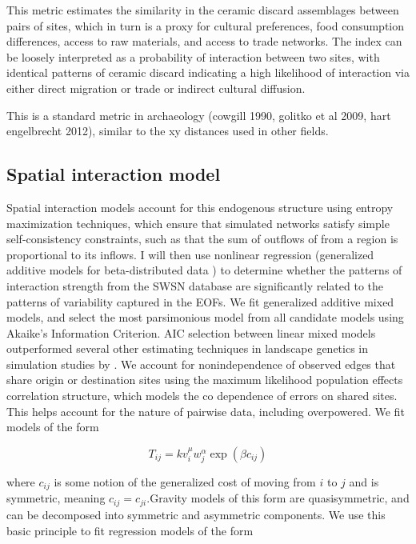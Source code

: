 \documentclass[fleqn,10pt]{wlscirep}
\begin{document}
This metric estimates the similarity in the ceramic discard assemblages between pairs of sites, which in turn is a proxy for cultural preferences, food consumption differences, access to raw materials, and access to trade networks. The index can be loosely interpreted as a probability of interaction between two sites, with identical patterns of ceramic discard indicating a high likelihood of interaction via either direct migration or trade or indirect cultural diffusion.

This is a standard metric in archaeology (cowgill 1990, golitko et al 2009, hart engelbrecht 2012), similar to the xy distances used in other fields.

\subsection*{Spatial interaction model}
Spatial interaction models account for this endogenous structure using entropy maximization techniques, which ensure that simulated networks satisfy simple self-consistency constraints, such as that the sum of outflows of from a region is proportional to its inflows.
I will then use nonlinear regression (generalized additive models for beta-distributed data \cite{Wood2006a}) to determine whether the patterns of interaction strength from the SWSN database are significantly related to the patterns of variability captured in the EOFs.
We fit generalized additive mixed models, and select the most parsimonious model from all candidate models using Akaike's Information Criterion. AIC selection between linear mixed models outperformed several other estimating techniques in landscape genetics in simulation studies by \cite{Shirk et al 2018}. We account for nonindependence of observed edges that share origin or destination sites using the maximum likelihood population effects correlation structure, which models the co dependence of errors on shared sites. This helps account for the nature of pairwise data, including overpowered.
We fit models of the form

\begin{equation}
T_{ij} = k v_i^\mu w_j^\alpha \exp(\beta c_{ij})
\end{equation}

where $c_{ij}$ is some notion of the generalized cost of moving from $i$ to $j$ and is symmetric, meaning $c_{ij} = c_{ji}$.Gravity models of this form are quasisymmetric, and can be decomposed into symmetric and asymmetric components. We use this basic principle to fit regression models of the form
\end{document}
